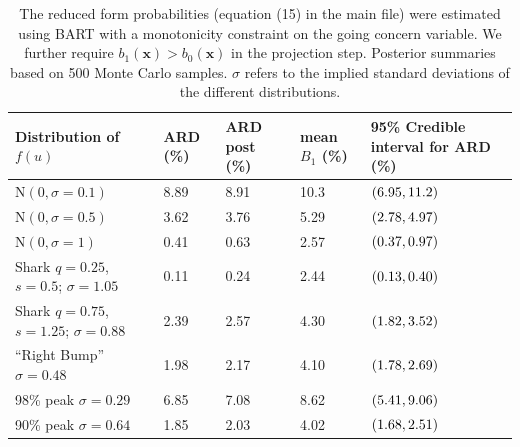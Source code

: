 \documentclass[aoas,preprint, 11pt, dvipsnames, table, x11name]{imsart}
\newcommand{\N}{\mbox{N}}
\renewcommand{\bm}[1]{\mathbf{#1}}
\theoremstyle{remark}
\begin{document}
	\begin{table}[h]
		\centering
	
		\begin{tabular}{lP{1.1cm}P{1.1cm}P{1.1cm}P{2.8cm}}
		
			\toprule
			Distribution of $f(u)$  & ARD (\%)&ARD post (\%)& mean $B_1$ (\%) &95\% Credible interval for ARD (\%)  \\ \midrule
			$\N(0,\sigma=0.1)$ &8.89&8.91&10.3&$\qty(6.95, 11.2)$\\ %
			$\N(0,\sigma=0.5)$ &3.62&3.76 &5.29 &$\qty(2.78, 4.97)$\\%
			$\N(0,\sigma=1)$&0.41&0.63&2.57&$\qty(0.37, 0.97)$\\
			Shark $q=0.25$, $s=0.5$; $\sigma=1.05$&0.11&0.24&2.44&$\qty(0.13, 0.40)$\\
			Shark $q=0.75$, $s=1.25$; $\sigma=0.88$&2.39&2.57&4.30&$\qty(1.82, 3.52)$\\
			
			``Right Bump'' $\sigma=0.48$&1.98&2.17&4.10&$\qty(1.78, 2.69)$\\
			98\% peak $\sigma=0.29$&6.85&7.08&8.62&$\qty(5.41, 9.06)$\\
			90\% peak $\sigma=0.64$&1.85&2.03&4.02&$\qty(1.68, 2.51)$\\
			
			\bottomrule%
		\end{tabular}
		\caption{The reduced form probabilities (equation (15) in the main file) were estimated using BART with a monotonicity constraint on the going concern variable.  We further require $b_1(\bm{x})>b_0(\bm{x})$ in the projection step.  Posterior summaries based on 500 Monte Carlo samples.  $\sigma$ refers to the implied standard deviations of the different distributions.}
		\label{resultssummary}
	\end{table}
	
\end{document}

